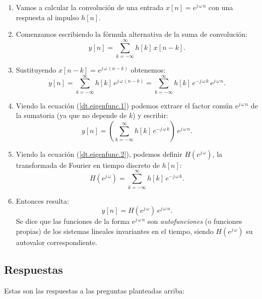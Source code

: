 \begin{enumerate}
	\item Vamos a calcular la convolución de una entrada $x[n] = e^{j \, \omega \, n}$ con una respuesta al impulso $h[n]$.
	\item Comenzamos escribiendo la fórmula alternativa de la suma de convolución:
	\begin{equation}
		y[n] = \sum_{k=-\infty}^{\infty} h[k] \, x[n-k].
	\end{equation}
	\item Sustituyendo $x[n - k] =  e^{j \, \omega \, (n-k)}$ obtenemos:
	\begin{equation}
		y[n] = \sum_{k=-\infty}^{\infty} h[k] \, e^{j \, \omega \, (n-k)} = \sum_{k=-\infty}^{\infty} h[k] \, e^{-j \, \omega \, k} \, e^{j \, \omega \, n}. \label{dt.eigenfunc.1}
	\end{equation}
	\item Viendo la ecuación (\ref{dt.eigenfunc.1}) podemos extraer el factor común $e^{j \, \omega \, n}$ de la sumatoria (ya que no depende de $k$) y escribir:
	\begin{equation}
		y[n] = \left(\sum_{k=-\infty}^{\infty} h[k] \, e^{-j \, \omega \, k}\right) \, e^{j \, \omega \, n}. \label{dt.eigenfunc.2}
	\end{equation}
	\item Viendo la ecuación (\ref{dt.eigenfunc.2}), podemos definir $H(e^{j \, \omega})$, la transformada de Fourier en tiempo discreto de $h[n]$:
	\begin{equation}
		H(e^{j \, \omega}) = \sum_{k=-\infty}^{\infty} h[k] \, e^{-j \, \omega \, k}. \label{dt.eigenfunc.3}
	\end{equation}	 
	\item Entonces resulta:
	\begin{equation}
		y[n] = H(e^{j \, \omega}) \, e^{j \, \omega \, n}.
	\end{equation}
	Se dice que las funciones de la forma $e^{j \, \omega \, n}$ son \textit{autofunciones} (o funciones propias) de los sistemas lineales invariantes en el tiempo, siendo $H(e^{j \, \omega})$ su autovalor correspondiente.
\end{enumerate}  

\subsection{Respuestas}

Estas son las respuestas a las preguntas planteadas arriba:

